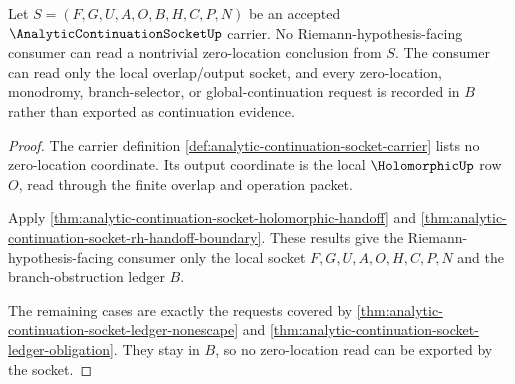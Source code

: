 \begin{theorem}
\label{thm:analytic-continuation-socket-no-zero-location-read}
Let $S=(F,G,U,A,O,B,H,C,P,N)$ be an accepted $\AnalyticContinuationSocketUp$ carrier. No Riemann-hypothesis-facing consumer can read a nontrivial zero-location conclusion from $S$. The consumer can read only the local overlap/output socket, and every zero-location, monodromy, branch-selector, or global-continuation request is recorded in $B$ rather than exported as continuation evidence.
\end{theorem}
\begin{proof}
The carrier definition \autoref{def:analytic-continuation-socket-carrier} lists no zero-location coordinate. Its output coordinate is the local $\HolomorphicUp$ row $O$, read through the finite overlap and operation packet.

Apply \autoref{thm:analytic-continuation-socket-holomorphic-handoff} and \autoref{thm:analytic-continuation-socket-rh-handoff-boundary}. These results give the Riemann-hypothesis-facing consumer only the local socket $F,G,U,A,O,H,C,P,N$ and the branch-obstruction ledger $B$.

The remaining cases are exactly the requests covered by \autoref{thm:analytic-continuation-socket-ledger-nonescape} and \autoref{thm:analytic-continuation-socket-ledger-obligation}. They stay in $B$, so no zero-location read can be exported by the socket.
\end{proof}

